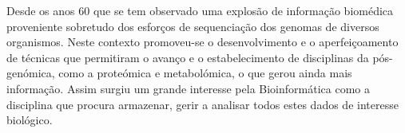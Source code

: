 \begin{abstractslongpt}



Desde os anos 60 que se tem observado uma explosão de informação biomédica proveniente sobretudo dos esforços de sequenciação dos genomas de diversos organismos. 
Neste contexto promoveu-se o desenvolvimento e o aperfeiçoamento de técnicas que permitiram o avanço e o estabelecimento de disciplinas da pós-genómica, como a proteómica e metabolómica, o que gerou ainda mais informação.
Assim surgiu um grande interesse pela Bioinformática como a disciplina que procura armazenar, gerir a analisar todos estes dados de interesse biológico.



\end{abstractslongpt}
